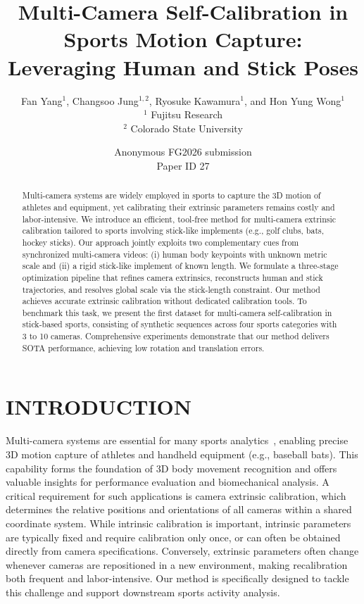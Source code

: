 \documentclass[a4paper, 10pt, conference]{ieeeconf}      %
\title{\LARGE \bf
Multi-Camera Self-Calibration in Sports Motion Capture: \\Leveraging Human and Stick Poses
}
\author{\parbox{16cm}{\centering
    {\large Fan Yang$^1$, Changsoo Jung$^{1,2}$, Ryosuke Kawamura$^1$, and Hon Yung Wong$^1$}\\
    {\normalsize
    $^1$ Fujitsu Research\\
    $^2$ Colorado State University}}%
}
\newcommand{\eg}{e.g.,\xspace}
\def\FGPaperID{27} %
\begin{document}
\ifFGfinal
\thispagestyle{empty}
\pagestyle{empty}
\else
\author{Anonymous FG2026 submission\\ Paper ID \FGPaperID \\}
\pagestyle{plain}
\fi
\maketitle
\thispagestyle{fancy} 


\begin{abstract}
Multi-camera systems are widely employed in sports to capture the 3D motion of athletes and equipment, yet calibrating their extrinsic parameters remains costly and labor-intensive. We introduce an efficient, tool-free method for multi-camera extrinsic calibration tailored to sports involving stick-like implements (\eg golf clubs, bats, hockey sticks). Our approach jointly exploits two complementary cues from synchronized multi-camera videos: (i) human body keypoints with unknown metric scale and (ii) a rigid stick-like implement of known length. We formulate a three-stage optimization pipeline that refines camera extrinsics, reconstructs human and stick trajectories, and resolves global scale via the stick-length constraint. Our method achieves accurate extrinsic calibration without dedicated calibration tools. To benchmark this task, we present the first dataset for multi-camera self-calibration in stick-based sports, consisting of synthetic sequences across four sports categories with 3 to 10 cameras. Comprehensive experiments demonstrate that our method delivers SOTA performance, achieving low rotation and translation errors.
\end{abstract}


\section{INTRODUCTION}

Multi-camera systems are essential for many sports analytics~\cite{wu2008multi,ren2010multi,luo2013feature, zhang2020multi,wang2024diffusion,yang2024enhancing,noorbhai2025conceptual,taylor2025biomechanical}, enabling precise 3D motion capture of athletes and handheld equipment (\eg baseball bats). This capability forms the foundation of 3D body movement recognition and offers valuable insights for performance evaluation and biomechanical analysis. A critical requirement for such applications is camera extrinsic calibration, which determines the relative positions and orientations of all cameras within a shared coordinate system. While intrinsic calibration is important, intrinsic parameters are typically fixed and require calibration only once, or can often be obtained directly from camera specifications. Conversely, extrinsic parameters often change whenever cameras are repositioned in a new environment, making recalibration both frequent and labor-intensive. Our method is specifically designed to tackle this challenge and support downstream sports activity analysis.
\end{document}
